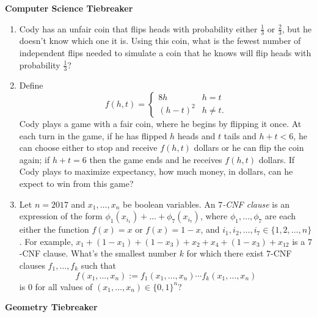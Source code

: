 \documentclass[10pt]{article}
\newcounter{enum}
\begin{document}
\newpage

\begin{center}
\huge\textbf{Computer Science Tiebreaker}
\end{center}

\begin{enumerate}

\item Cody has an unfair coin that flips heads with probability either $\tfrac13$ or $\tfrac23$, but he doesn't know which one it is. Using this coin, what is the fewest number of independent flips needed to simulate a coin that he knows will flip heads with probability $\tfrac13$?


\item Define
\[f(h,t) =
\begin{cases}
8h & h = t \\
(h-t)^2 & h \neq t.
\end{cases}\]
Cody plays a game with a fair coin, where he begins by flipping it once. At each turn in the game, if he has flipped $h$ heads and $t$ tails and $h + t < 6$, he can choose either to stop and receive $f(h,t)$ dollars or he can flip the coin again; if $h + t = 6$ then the game ends and he receives $f(h,t)$ dollars. If Cody plays to maximize expectancy, how much money, in dollars, can he expect to win from this game? 


\item Let $n=2017$ and $x_1,\dots,x_n$ be boolean variables. An \emph{$7$-CNF clause} is an expression of the form $\phi_1(x_{i_1})+\dots+\phi_7(x_{i_7})$, where $\phi_1,\dots,\phi_7$ are each either the function $f(x)=x$ or $f(x)=1-x$, and $i_1,i_2,\dots,i_7\in\{1,2,\dots,n\}$. For example, $x_1+(1-x_1)+(1-x_3)+x_2+x_4+(1-x_3)+x_{12}$ is a $7$-CNF clause. What's the smallest number $k$ for which there exist $7$-CNF clauses $f_1,\dots,f_k$ such that \[f(x_1,\dots,x_n):=f_1(x_1,\dots,x_n)\cdots f_k(x_1,\dots,x_n)\] is $0$ for all values of $(x_1,\dots,x_n)\in\{0,1\}^n$?

\end{enumerate}

\newpage

\begin{center}
\huge\textbf{Geometry Tiebreaker}
\end{center}
\end{document}
